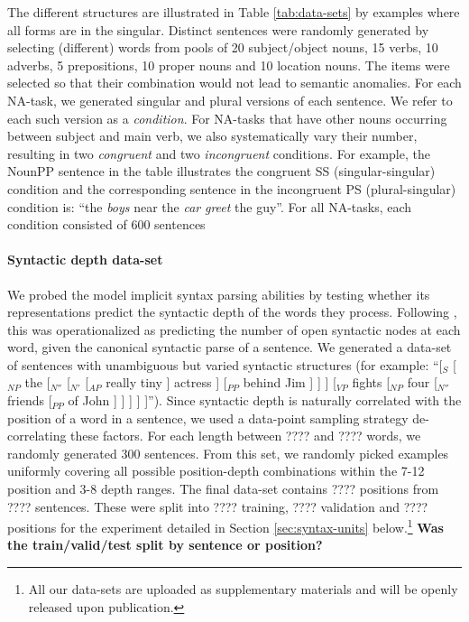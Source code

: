The different structures are illustrated in Table \ref{tab:data-sets}
by examples where all forms are in the singular. Distinct sentences
were randomly generated by selecting (different) words from pools of
20 subject/object nouns, 15 verbs, 10 adverbs, 5 prepositions, 10
proper nouns and 10 location nouns. The items were selected so that
their combination would not lead to semantic anomalies. For each
NA-task, we generated singular and plural versions of each
sentence. We refer to each such version as a \textit{condition}. For
NA-tasks that have other nouns occurring between subject and main
verb, we also systematically vary their number, resulting in two
\textit{congruent} and two \textit{incongruent} conditions. For example, the NounPP
sentence in the table illustrates the congruent SS (singular-singular)
condition and the corresponding sentence in the incongruent PS (plural-singular)
condition is: ``the \emph{boys} near the \emph{car} \emph{greet} the guy''. For all
NA-tasks, each condition consisted of 600 sentences

\paragraph{Syntactic depth data-set} We probed the model implicit
syntax parsing abilities by testing whether its representations
predict the syntactic depth of the words they process. Following
, this was operationalized as predicting the
number of open syntactic nodes at each word, given the canonical
syntactic parse of a sentence.  We generated a data-set of sentences
with unambiguous but varied syntactic structures (for example: ``[$_S$
[$_{NP}$ the [$_{N''}$ [$_{N'}$ [$_{AP}$ really tiny ] actress ]
[$_{PP}$ behind Jim ] ] ] [$_{VP}$ fights [$_{NP}$ four [$_{N''}$
friends [$_{PP}$ of John ] ] ] ] ]''). Since syntactic depth is
naturally correlated with the position of a word in a sentence, we
used a data-point sampling strategy de-correlating these factors. For
each length between ????  and ???? words, we randomly generated 300
sentences. From this set, we randomly picked examples uniformly
covering all possible position-depth combinations within the 7-12
position and 3-8 depth ranges.  The final data-set contains ????
positions from ???? sentences. These were split into ???? training,
???? validation and ???? positions for the experiment detailed in
Section \ref{sec:syntax-units} below.\footnote{All our data-sets are
  uploaded as supplementary materials and will be openly released upon
  publication.} \textbf{Was the train/valid/test split by sentence or
  position?}

